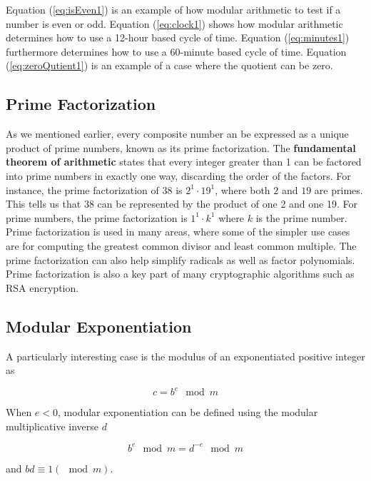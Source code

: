 \documentclass{article}
\renewcommand{\_}{\ifincsname_\else\legacyunderscore\fi}
\begin{document}
        Equation (\ref{eq:isEven1}) is an example of how modular arithmetic to test if a number is even or odd.  Equation (\ref{eq:clock1}) shows how modular arithmetic determines how to use a 12-hour based cycle of time.  Equation (\ref{eq:minutes1}) furthermore determines how to use a 60-minute based cycle of time.  Equation (\ref{eq:zeroQutient1}) is an example of a case where the quotient can be zero.

    \subsection*{Prime Factorization}
    As we mentioned earlier, every composite number an be expressed as a unique product of prime numbers, known as its prime factorization. The \textbf{fundamental theorem of arithmetic} states that every integer greater than 1 can be factored into prime numbers in exactly one way, discarding the order of the factors. For instance, the prime factorization of $38$ is $2^1\cdot 19^1$, where both $2$ and $19$ are primes. This tells us that $38$ can be represented by the product of one 2 and one 19. For prime numbers, the prime factorization is $1^1\cdot k^1$ where $k$ is the prime number. Prime factorization is used in many areas, where some of the simpler use cases are for computing the greatest common divisor and least common multiple. The prime factorization can also help simplify radicals as well as factor polynomials. Prime factorization is also a key part of many cryptographic algorithms such as RSA encryption. 

    \subsection*{Modular Exponentiation}

        A particularly interesting case is the modulus of an exponentiated positive integer as

        \begin{equation}
            c = b^e \mod m
        \end{equation}

        When $e < 0$, modular exponentiation can be defined using the modular multiplicative inverse $d$

        \begin{equation}
            b^e \mod m = d^{-e} \mod m
        \end{equation}

        and $b d \equiv 1 (\mod m)$.
\end{document}
